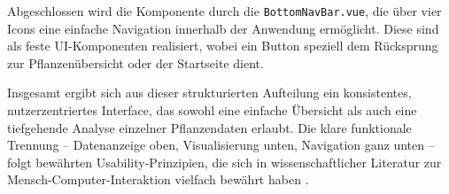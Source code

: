 Abgeschlossen wird die Komponente durch die \texttt{BottomNavBar.vue}, die über vier Icons eine einfache Navigation innerhalb der Anwendung ermöglicht. Diese sind als feste UI-Komponenten realisiert, wobei ein Button speziell dem Rücksprung zur Pflanzenübersicht oder der Startseite dient.

Insgesamt ergibt sich aus dieser strukturierten Aufteilung ein konsistentes, nutzerzentriertes Interface, das sowohl eine einfache Übersicht als auch eine tiefgehende Analyse einzelner Pflanzendaten erlaubt. Die klare funktionale Trennung – Datenanzeige oben, Visualisierung unten, Navigation ganz unten – folgt bewährten Usability-Prinzipien, die sich in wissenschaftlicher Literatur zur Mensch-Computer-Interaktion vielfach bewährt haben \cite{norman2013design}.


